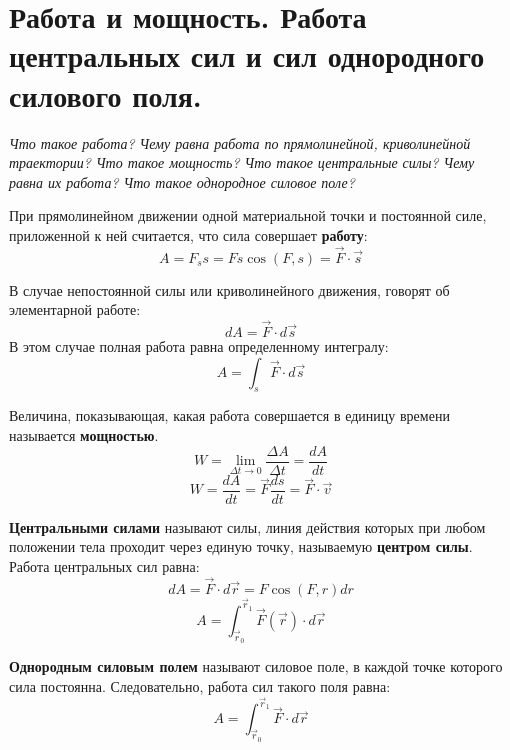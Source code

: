 \documentclass{article}
\begin{document}
  \section{Работа и мощность. Работа центральных сил и сил однородного силового поля.}
    \par
      \textit{Что такое работа? Чему равна работа по прямолинейной, криволинейной траектории? Что такое мощность? Что такое центральные силы? Чему равна их работа? Что такое однородное силовое поле?}\\
    \par
      При прямолинейном движении одной материальной точки и постоянной силе, приложенной к ней считается, что сила совершает \textbf{работу}:
      \begin{equation}
	A=F_ss=Fs\cos(F,s)=\vec F \cdot \vec s
      \end{equation}
    \par
      В случае непостоянной силы или криволинейного движения, говорят об элементарной работе:
      \begin{equation}
	dA=\vec F\cdot d\vec s
      \end{equation}
      В этом случае полная работа равна определенному интегралу:
      \begin{equation}
	A=\int_s{\vec F\cdot d\vec s}
      \end{equation}
    \par
      Величина, показывающая, какая работа совершается в единицу времени называется \textbf{мощностью}.
      \begin{equation}
	W=\lim_{\Delta t\rightarrow 0}{\frac{\Delta A}{\Delta t}}=\frac{dA}{dt}
      \end{equation}
      \begin{equation}
	W=\frac{dA}{dt}=\vec F\frac{ds}{dt}=\vec F \cdot \vec v
      \end{equation}
    \par
      \textbf{Центральными силами} называют силы, линия действия которых при любом положении тела проходит через единую точку, называемую \textbf{центром силы}. Работа центральных сил равна:
      \begin{equation}
	dA=\vec F\cdot d\vec r = F\cos(F,r)dr
      \end{equation}
      \begin{equation}
	A=\int^{\vec r_1}_{\vec r_0}{\vec F(\vec r)\cdot d\vec r}
      \end{equation}
    \par
      \textbf{Однородным силовым полем} называют силовое поле, в каждой точке которого сила постоянна. Следовательно, работа сил такого поля равна:
      \begin{equation}
	A=\int^{\vec r_1}_{\vec r_0}{\vec F\cdot d\vec r}
      \end{equation}
  \clearpage    
\end{document}
